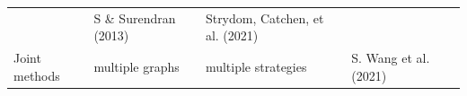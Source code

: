 \documentclass[10pt,oneside]{article}
\begin{document}
\begin{longtable}[]{@{}lllll@{}}
\begin{minipage}[t]{0.23\columnwidth}
\end{minipage} & \begin{minipage}[t]{0.14\columnwidth}\raggedright
S \& Surendran (2013)\strut
\end{minipage} & \begin{minipage}[t]{0.29\columnwidth}\raggedright
Strydom, Catchen, et al. (2021)\strut
\end{minipage}\tabularnewline
\begin{minipage}[t]{0.09\columnwidth}\raggedright
Joint methods\strut
\end{minipage} & \begin{minipage}[t]{0.11\columnwidth}\raggedright
multiple graphs\strut
\end{minipage} & \begin{minipage}[t]{0.23\columnwidth}\raggedright
multiple strategies\strut
\end{minipage} & \begin{minipage}[t]{0.14\columnwidth}\raggedright
S. Wang et al. (2021)\strut
\end{minipage} & \begin{minipage}[t]{0.29\columnwidth}\raggedright
\strut
\end{minipage}\tabularnewline
\bottomrule
\end{longtable}
\end{document}
